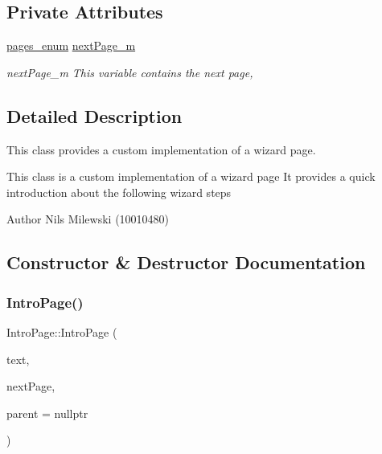 \subsection*{Private Attributes}
\begin{DoxyCompactItemize}
\item 
\mbox{\hyperlink{namespaceui_1_1wizard_1_1pages_a1a25c157e498474f0cf868944a52bf44}{pages\+\_\+enum}} \mbox{\hyperlink{classui_1_1wizard_1_1pages_1_1_intro_page_a8b77ec9feb8996a03d71f034ee3296ca}{next\+Page\+\_\+m}}
\begin{DoxyCompactList}\small\item\em next\+Page\+\_\+m This variable contains the next page, \end{DoxyCompactList}\end{DoxyCompactItemize}


\subsection{Detailed Description}
This class provides a custom implementation of a wizard page. 

This class is a custom implementation of a wizard page It provides a quick introduction about the following wizard steps \begin{DoxyAuthor}{Author}
Nils Milewski (10010480) 
\end{DoxyAuthor}


\subsection{Constructor \& Destructor Documentation}
\mbox{\label{classui_1_1wizard_1_1pages_1_1_intro_page_ad984d57f77f15e89e82d1184c997b778}} 
\subsubsection{\texorpdfstring{Intro\+Page()}{IntroPage()}}
{\footnotesize\ttfamily Intro\+Page\+::\+Intro\+Page (\begin{DoxyParamCaption}\item[{Q\+String}]{text,  }\item[{\mbox{\hyperlink{namespaceui_1_1wizard_1_1pages_a1a25c157e498474f0cf868944a52bf44}{pages\+\_\+enum}}}]{next\+Page,  }\item[{Q\+Widget $\ast$}]{parent = {\ttfamily nullptr} }\end{DoxyParamCaption})}



